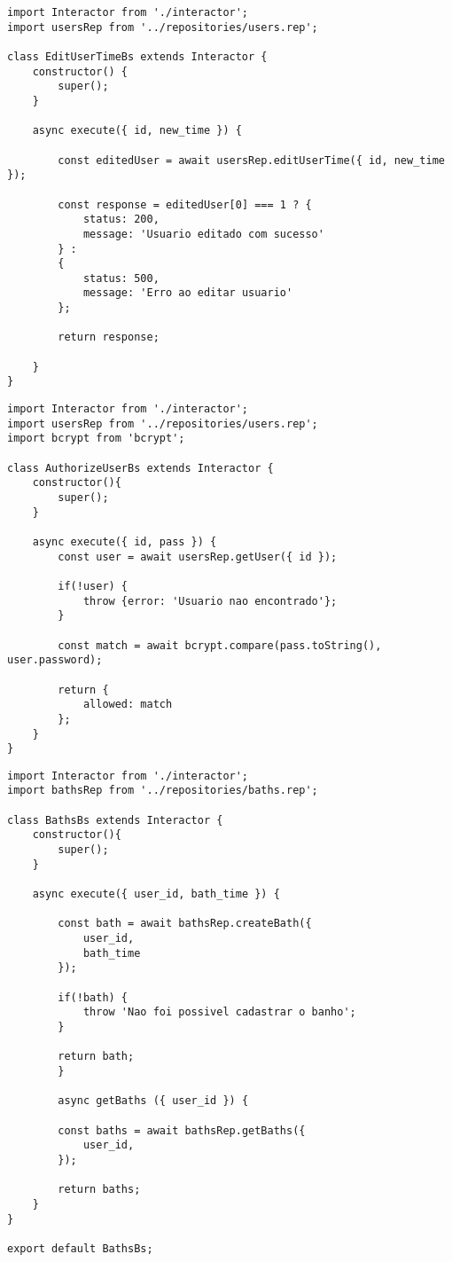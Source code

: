 \newpage

\begin{lstlisting}[caption=Exemplo do código do \textit{interactor} de edição de tempo de banho dos usuários]
import Interactor from './interactor';
import usersRep from '../repositories/users.rep';

class EditUserTimeBs extends Interactor {
	constructor() {
		super();
	}
	
	async execute({ id, new_time }) {
	
		const editedUser = await usersRep.editUserTime({ id, new_time });
		
		const response = editedUser[0] === 1 ? {
			status: 200,
			message: 'Usuario editado com sucesso'
		} : 
		{
			status: 500,
			message: 'Erro ao editar usuario'
		};
		
		return response;
	
	}
}
\end{lstlisting}

\newpage

\begin{lstlisting}[caption=Exemplo do código do \textit{interactor} de autorização de usuários]
import Interactor from './interactor';
import usersRep from '../repositories/users.rep';
import bcrypt from 'bcrypt';

class AuthorizeUserBs extends Interactor {
	constructor(){
		super();
	}
	
	async execute({ id, pass }) {
		const user = await usersRep.getUser({ id });
		
		if(!user) {
			throw {error: 'Usuario nao encontrado'};
		}
		
		const match = await bcrypt.compare(pass.toString(), user.password);
		
		return {
			allowed: match
		};
	}
}
\end{lstlisting}

\newpage

\begin{lstlisting}[caption=Exemplo do código do \textit{interactor} de cadastro de banhos]
import Interactor from './interactor';
import bathsRep from '../repositories/baths.rep';

class BathsBs extends Interactor {
	constructor(){
		super();
	}
	
	async execute({ user_id, bath_time }) {
	
		const bath = await bathsRep.createBath({
			user_id,
			bath_time
		});
		
		if(!bath) {
			throw 'Nao foi possivel cadastrar o banho';
		}
		
		return bath;
		}
		
		async getBaths ({ user_id }) {
		
		const baths = await bathsRep.getBaths({
			user_id,
		});
		
		return baths;
	}
}

export default BathsBs;
\end{lstlisting}

